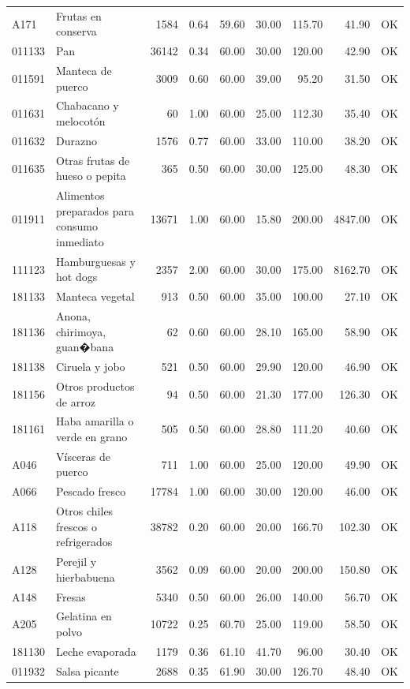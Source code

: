 \begin{table}[ht]
\begin{tabular}{llrrrrrrl}
  A171 & Frutas en conserva & 1584 & 0.64 & 59.60 & 30.00 & 115.70 & 41.90 & OK \\ 
  011133 & Pan & 36142 & 0.34 & 60.00 & 30.00 & 120.00 & 42.90 & OK \\ 
  011591 & Manteca de puerco & 3009 & 0.60 & 60.00 & 39.00 & 95.20 & 31.50 & OK \\ 
  011631 & Chabacano y melocotón &  60 & 1.00 & 60.00 & 25.00 & 112.30 & 35.40 & OK \\ 
  011632 & Durazno & 1576 & 0.77 & 60.00 & 33.00 & 110.00 & 38.20 & OK \\ 
  011635 & Otras frutas de hueso o pepita & 365 & 0.50 & 60.00 & 30.00 & 125.00 & 48.30 & OK \\ 
  011911 & Alimentos preparados para consumo inmediato & 13671 & 1.00 & 60.00 & 15.80 & 200.00 & 4847.00 & OK \\ 
  111123 & Hamburguesas y hot dogs & 2357 & 2.00 & 60.00 & 30.00 & 175.00 & 8162.70 & OK \\ 
  181133 & Manteca vegetal & 913 & 0.50 & 60.00 & 35.00 & 100.00 & 27.10 & OK \\ 
  181136 & Anona, chirimoya, guan�bana &  62 & 0.60 & 60.00 & 28.10 & 165.00 & 58.90 & OK \\ 
  181138 & Ciruela y jobo & 521 & 0.50 & 60.00 & 29.90 & 120.00 & 46.90 & OK \\ 
  181156 & Otros productos de arroz &  94 & 0.50 & 60.00 & 21.30 & 177.00 & 126.30 & OK \\ 
  181161 & Haba amarilla o verde en grano & 505 & 0.50 & 60.00 & 28.80 & 111.20 & 40.60 & OK \\ 
  A046 & Vísceras de puerco & 711 & 1.00 & 60.00 & 25.00 & 120.00 & 49.90 & OK \\ 
  A066 & Pescado fresco & 17784 & 1.00 & 60.00 & 30.00 & 120.00 & 46.00 & OK \\ 
  A118 & Otros chiles frescos o refrigerados & 38782 & 0.20 & 60.00 & 20.00 & 166.70 & 102.30 & OK \\ 
  A128 & Perejil y hierbabuena & 3562 & 0.09 & 60.00 & 20.00 & 200.00 & 150.80 & OK \\ 
  A148 & Fresas & 5340 & 0.50 & 60.00 & 26.00 & 140.00 & 56.70 & OK \\ 
  A205 & Gelatina en polvo & 10722 & 0.25 & 60.70 & 25.00 & 119.00 & 58.50 & OK \\ 
  181130 & Leche evaporada & 1179 & 0.36 & 61.10 & 41.70 & 96.00 & 30.40 & OK \\ 
  011932 & Salsa picante & 2688 & 0.35 & 61.90 & 30.00 & 126.70 & 48.40 & OK \\ 

\end{tabular}
\end{table}
